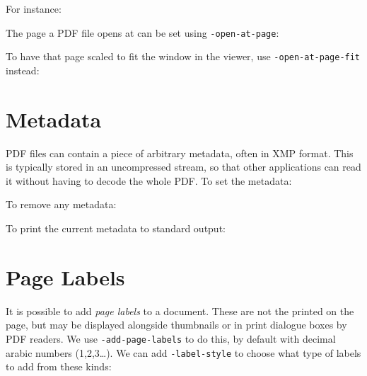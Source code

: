 \documentclass{book}
\begin{document}
  \noindent For instance:

\noindent{}

\noindent The page a PDF file opens at can be set using \texttt{-open-at-page}:

\noindent{}

\noindent To have that page scaled to fit the window in the viewer, use \texttt{-open-at-page-fit} instead:

\noindent{}


  \section{Metadata}
  PDF files can contain a piece of arbitrary metadata, often in XMP format.
This is typically stored in an uncompressed stream, so that other applications
can read it without having to decode the whole PDF. To set the metadata:

\noindent{}

  \noindent To remove any metadata:

\noindent{}
  \noindent To print the current metadata to standard output:

\noindent{}



\section{Page Labels}

It is possible to add \textit{page labels} to a document. These are not the printed on the page, but may be displayed alongside thumbnails or in print dialogue boxes by PDF readers. We use \texttt{-add-page-labels} to do this, by default with decimal arabic numbers (1,2,3\ldots). We can add \texttt{-label-style} to choose what type of labels to add from these kinds:
\end{document}
